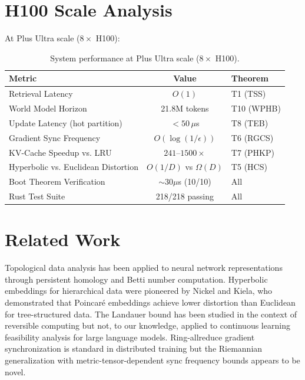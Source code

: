 \documentclass[11pt, a4paper]{article}
\theoremstyle{proofform}
\numberwithin{innerpoints}{subsection}
\numberwithin{disproof}{subsection}
\theoremstyle{mathproof}
\begin{document}
\section{H100 Scale Analysis}
\label{sec:scale}

At Plus Ultra scale ($8 \times$ H100):

\begin{table}[h!]
\centering
\caption{System performance at Plus Ultra scale ($8 \times$ H100).}
\label{tab:scale}
\begin{tabular}{l|c|l}
\hline
\textbf{Metric} & \textbf{Value} & \textbf{Theorem} \\
\hline
Retrieval Latency & $O(1)$ & T1 (TSS) \\
World Model Horizon & 21.8M tokens & T10 (WPHB) \\
Update Latency (hot partition) & $< 50\,\mu$s & T8 (TEB) \\
Gradient Sync Frequency & $O(\log(1/\epsilon))$ & T6 (RGCS) \\
KV-Cache Speedup vs. LRU & $241$--$1500\times$ & T7 (PHKP) \\
Hyperbolic vs. Euclidean Distortion & $O(1/D)$ vs $\Omega(D)$ & T5 (HCS) \\
Boot Theorem Verification & $\sim$30$\mu$s (10/10) & All \\
Rust Test Suite & 218/218 passing & All \\
\hline
\end{tabular}
\end{table}

\section{Related Work}
\label{sec:related}

Topological data analysis has been applied to neural network representations through persistent homology and Betti number computation. Hyperbolic embeddings for hierarchical data were pioneered by Nickel and Kiela, who demonstrated that Poincar\'e embeddings achieve lower distortion than Euclidean for tree-structured data. The Landauer bound has been studied in the context of reversible computing but not, to our knowledge, applied to continuous learning feasibility analysis for large language models. Ring-allreduce gradient synchronization is standard in distributed training but the Riemannian generalization with metric-tensor-dependent sync frequency bounds appears to be novel.
\end{document}
